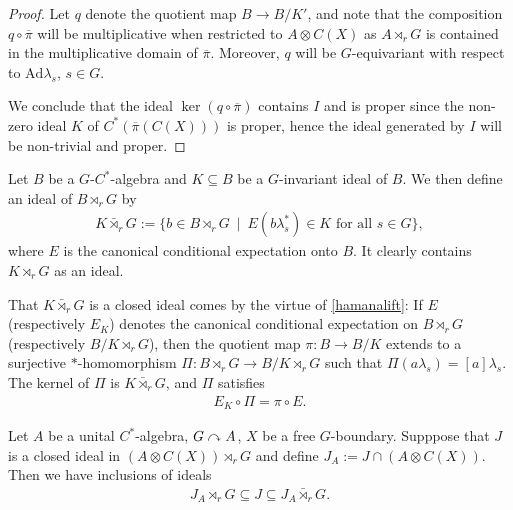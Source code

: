 \begin{proof}
	Let $q$ denote the quotient map $B \to B/K'$, and note that the composition $q \circ \overline \pi$ will be multiplicative when restricted to $A \otimes C(X)$ as $A \rtimes_r G$ is contained in the multiplicative domain of $\overline \pi$. Moreover, $q$ will be $G$-equivariant with respect to $\mathrm{Ad} \lambda_s$, $s \in G$. 

	We conclude that the ideal $\ker (q \circ \overline \pi)$ contains $I$ and is proper since the non-zero ideal $K$ of $C^*(\overline \pi(C(X)))$ is proper, hence the ideal generated by $I$ will be non-trivial and proper.
\end{proof}
\begin{definition}
	Let $B$ be a $G$-$C^*$-algebra and $K \subseteq B$ be a $G$-invariant ideal of $B$. We then define an ideal  of $B \rtimes_r G$ by
	\begin{align*}
		K \bar \rtimes_r G := \{b \in B \rtimes_r G \ \mid \ E(b \lambda_s^* ) \in K \text{ for all } s \in G\},
	\end{align*}
	where $E$ is the canonical conditional expectation onto $B$. It clearly contains $K \rtimes_r G$ as an ideal.
\end{definition}
\begin{remark}
	That $K \bar \rtimes_r G$ is a closed ideal comes by the virtue of \cref{hamanalift}: If $E$ (respectively $E_K$) denotes the canonical conditional expectation on $B \rtimes_r G$ (respectively $B/K \rtimes_r G$), then the quotient map $\pi \colon B \to B/K$ extends to a surjective $*$-homomorphism $\Pi \colon B \rtimes_r G \to B/K \rtimes_r G$ such that $\Pi(a \lambda_s) = [a] \lambda_s$. The kernel of $\Pi$ is $K \bar \rtimes_r G$, and $\Pi$ satisfies
	\begin{align*}
		E_K \circ \Pi =  \pi \circ E.
	\end{align*}
	\label{condidealrem}
\end{remark}
\begin{proposition}
	Let $A$ be a unital $C^*$-algebra, $G \stackrel{}{\curvearrowright} {A}$, $X$ be a free $G$-boundary. Supppose that $J$ is a closed ideal in $(A \otimes C(X)) \rtimes_r G$ and define $J_A := J \cap (A \otimes C(X))$. Then we have inclusions of ideals
	\begin{align*}
		 J_A \rtimes_r G \subseteq J \subseteq J_A \bar \rtimes_r G.
	\end{align*}
	\label{ozawprop18}
\end{proposition}
